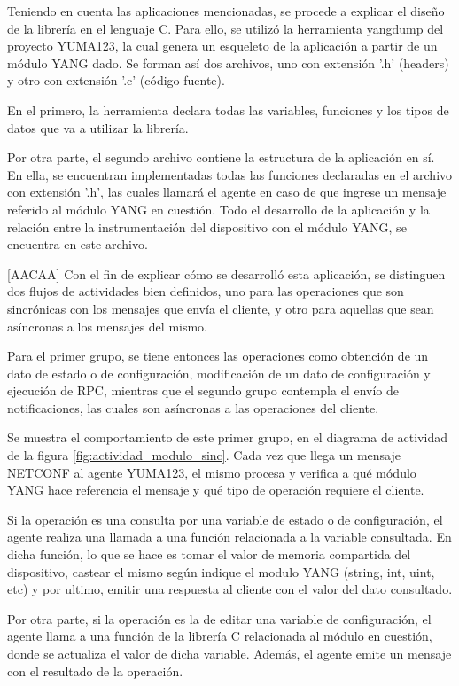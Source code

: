   Teniendo en cuenta las aplicaciones mencionadas, se procede a explicar el diseño de la librería en el lenguaje C. Para ello, se utilizó la herramienta yangdump del proyecto YUMA123, la cual genera un esqueleto de la aplicación a partir de un módulo YANG dado. Se forman así dos archivos, uno con extensión '.h' (headers) y otro con extensión '.c' (código fuente). 
  

  En el primero, la herramienta declara todas las variables, funciones y los tipos de datos que va a utilizar la librería. 

  Por otra parte, el segundo archivo contiene la estructura de la aplicación en sí. En ella, se encuentran implementadas todas las funciones declaradas en el archivo con extensión '.h', las cuales llamará el agente en caso de que ingrese un mensaje referido al módulo YANG en cuestión. Todo el desarrollo de la aplicación y la relación entre la instrumentación del dispositivo con el módulo YANG, se encuentra en este archivo. 


  [AACAA] Con el fin de explicar cómo se desarrolló esta aplicación, se distinguen dos flujos de actividades bien definidos, uno para las operaciones que son sincrónicas con los mensajes que envía el cliente, y otro para aquellas que sean asíncronas a los mensajes del mismo. 

  Para el primer grupo, se tiene entonces las operaciones como obtención de un dato de estado o de configuración, modificación de un dato de configuración y ejecución de RPC, mientras que el segundo grupo contempla el envío de notificaciones, las cuales son asíncronas a las operaciones del cliente.
  

  Se muestra el comportamiento de este primer grupo, en el diagrama de actividad de la figura \ref{fig:actividad_modulo_sinc}. Cada vez que llega un mensaje NETCONF al agente YUMA123, el mismo procesa y verifica a qué módulo YANG hace referencia el mensaje y qué tipo de operación requiere el cliente. 

  Si la operación es una consulta por una variable de estado o de configuración, el agente realiza una llamada a una función relacionada a la variable consultada. En dicha función, lo que se hace es tomar el valor de memoria compartida del dispositivo, castear el mismo según indique el modulo YANG (string, int, uint, etc) y por ultimo, emitir una respuesta al cliente con el valor del dato consultado.

  Por otra parte, si la operación es la de editar una variable de configuración, el agente llama a una función de la librería C relacionada al módulo en cuestión, donde se actualiza el valor de dicha variable. Además, el agente emite un mensaje con el resultado de la operación. 

